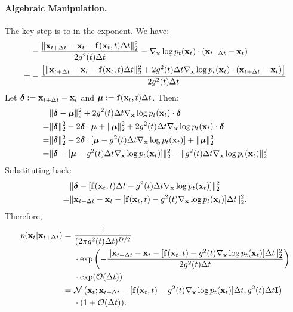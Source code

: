 \paragraph{Algebraic Manipulation.}
The key step is to  in the exponent. We have:
\begin{align*}
    &-\frac{\|{\mathbf{x}}_{t+\Delta t} - {\mathbf{x}}_t - {\mathbf{f}}({\mathbf{x}}_t, t) \Delta t\|_2^2}{2 g^2(t) \Delta t} - \nabla_{{\mathbf{x}}} \log p_t({\mathbf{x}}_t) \cdot ({\mathbf{x}}_{t+\Delta t} - {\mathbf{x}}_t) \nonumber \\
    = &-\frac{\left[\|{\mathbf{x}}_{t+\Delta t} - {\mathbf{x}}_t - {\mathbf{f}}({\mathbf{x}}_t, t) \Delta t\|_2^2 + 2 g^2(t) \Delta t \nabla_{{\mathbf{x}}} \log p_t({\mathbf{x}}_t) \cdot ({\mathbf{x}}_{t+\Delta t} - {\mathbf{x}}_t)\right]}{2 g^2(t) \Delta t} 
\end{align*}
Let $\boldsymbol{\delta} := {\mathbf{x}}_{t+\Delta t} - {\mathbf{x}}_t$ and $\boldsymbol{\mu} := {\mathbf{f}}({\mathbf{x}}_t, t) \Delta t$. Then:
\begin{align*}
    &\|\boldsymbol{\delta} - \boldsymbol{\mu}\|_2^2 + 2 g^2(t) \Delta t \nabla_{{\mathbf{x}}} \log p_t({\mathbf{x}}_t) \cdot \boldsymbol{\delta} \nonumber \\
    = &\|\boldsymbol{\delta}\|_2^2 - 2\boldsymbol{\delta} \cdot \boldsymbol{\mu} + \|\boldsymbol{\mu}\|_2^2 + 2 g^2(t) \Delta t \nabla_{{\mathbf{x}}} \log p_t({\mathbf{x}}_t) \cdot \boldsymbol{\delta} \nonumber \\
    = &\|\boldsymbol{\delta}\|_2^2 - 2\boldsymbol{\delta} \cdot [\boldsymbol{\mu} - g^2(t) \Delta t \nabla_{{\mathbf{x}}} \log p_t({\mathbf{x}}_t)] + \|\boldsymbol{\mu}\|_2^2 \nonumber \\
    = &\|\boldsymbol{\delta} - [\boldsymbol{\mu} - g^2(t) \Delta t \nabla_{{\mathbf{x}}} \log p_t({\mathbf{x}}_t)]\|_2^2 - \|g^2(t) \Delta t \nabla_{{\mathbf{x}}} \log p_t({\mathbf{x}}_t)\|_2^2 
\end{align*}
Substituting back:
\begin{align*}
    &\|\boldsymbol{\delta} - [{\mathbf{f}}({\mathbf{x}}_t, t) \Delta t - g^2(t) \Delta t \nabla_{{\mathbf{x}}} \log p_t({\mathbf{x}}_t)]\|_2^2 \nonumber \\
    = &\|{\mathbf{x}}_{t+\Delta t} - {\mathbf{x}}_t - [{\mathbf{f}}({\mathbf{x}}_t, t) - g^2(t) \nabla_{{\mathbf{x}}} \log p_t({\mathbf{x}}_t)] \Delta t\|_2^2. 
\end{align*}
Therefore,
\begin{align*}
    p({\mathbf{x}}_t | {\mathbf{x}}_{t+\Delta t}) 
    =~&\frac{1}{(2\pi g^2(t) \Delta t)^{D/2}} \nonumber \\
    \quad &\cdot \exp\left(-\frac{\|{\mathbf{x}}_{t+\Delta t} - {\mathbf{x}}_t - [{\mathbf{f}}({\mathbf{x}}_t, t) - g^2(t) \nabla_{{\mathbf{x}}} \log p_t({\mathbf{x}}_t)] \Delta t\|_2^2}{2 g^2(t) \Delta t}\right) \nonumber \\
    \quad &\cdot \exp(\mathcal{O}(\Delta t)) \nonumber \\
    =~&\mathcal{N}\left({\mathbf{x}}_t; {\mathbf{x}}_{t+\Delta t} - [{\mathbf{f}}({\mathbf{x}}_t, t) - g^2(t) \nabla_{{\mathbf{x}}} \log p_t({\mathbf{x}}_t)] \Delta t, g^2(t) \Delta t \mathbf{I}\right) \nonumber \\
    \quad &\cdot (1 + \mathcal{O}(\Delta t)).
\end{align*}
